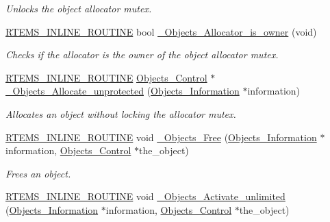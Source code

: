 \begin{DoxyCompactItemize}
\begin{DoxyCompactList}\small\item\em Unlocks the object allocator mutex. \end{DoxyCompactList}\item 
\mbox{\hyperlink{group__RTEMSScoreBaseDefs_gac216239df231d5dbd15e3520b0b9313f}{R\+T\+E\+M\+S\+\_\+\+I\+N\+L\+I\+N\+E\+\_\+\+R\+O\+U\+T\+I\+NE}} bool \mbox{\hyperlink{group__RTEMSScoreObject_ga67f9cdae9423a81e46626f0e2cb9f305}{\+\_\+\+Objects\+\_\+\+Allocator\+\_\+is\+\_\+owner}} (void)
\begin{DoxyCompactList}\small\item\em Checks if the allocator is the owner of the object allocator mutex. \end{DoxyCompactList}\item 
\mbox{\hyperlink{group__RTEMSScoreBaseDefs_gac216239df231d5dbd15e3520b0b9313f}{R\+T\+E\+M\+S\+\_\+\+I\+N\+L\+I\+N\+E\+\_\+\+R\+O\+U\+T\+I\+NE}} \mbox{\hyperlink{structObjects__Control}{Objects\+\_\+\+Control}} $\ast$ \mbox{\hyperlink{group__RTEMSScoreObject_gaf72f90dc17914740829466f086c33668}{\+\_\+\+Objects\+\_\+\+Allocate\+\_\+unprotected}} (\mbox{\hyperlink{structObjects__Information}{Objects\+\_\+\+Information}} $\ast$information)
\begin{DoxyCompactList}\small\item\em Allocates an object without locking the allocator mutex. \end{DoxyCompactList}\item 
\mbox{\hyperlink{group__RTEMSScoreBaseDefs_gac216239df231d5dbd15e3520b0b9313f}{R\+T\+E\+M\+S\+\_\+\+I\+N\+L\+I\+N\+E\+\_\+\+R\+O\+U\+T\+I\+NE}} void \mbox{\hyperlink{group__RTEMSScoreObject_ga2215dcf7e3251e6f629b6a3a96fff44e}{\+\_\+\+Objects\+\_\+\+Free}} (\mbox{\hyperlink{structObjects__Information}{Objects\+\_\+\+Information}} $\ast$information, \mbox{\hyperlink{structObjects__Control}{Objects\+\_\+\+Control}} $\ast$the\+\_\+object)
\begin{DoxyCompactList}\small\item\em Frees an object. \end{DoxyCompactList}\item 
\mbox{\hyperlink{group__RTEMSScoreBaseDefs_gac216239df231d5dbd15e3520b0b9313f}{R\+T\+E\+M\+S\+\_\+\+I\+N\+L\+I\+N\+E\+\_\+\+R\+O\+U\+T\+I\+NE}} void \mbox{\hyperlink{group__RTEMSScoreObject_gacbd8e518804904ffb1591e64830cf89f}{\+\_\+\+Objects\+\_\+\+Activate\+\_\+unlimited}} (\mbox{\hyperlink{structObjects__Information}{Objects\+\_\+\+Information}} $\ast$information, \mbox{\hyperlink{structObjects__Control}{Objects\+\_\+\+Control}} $\ast$the\+\_\+object)

\end{DoxyCompactItemize}

